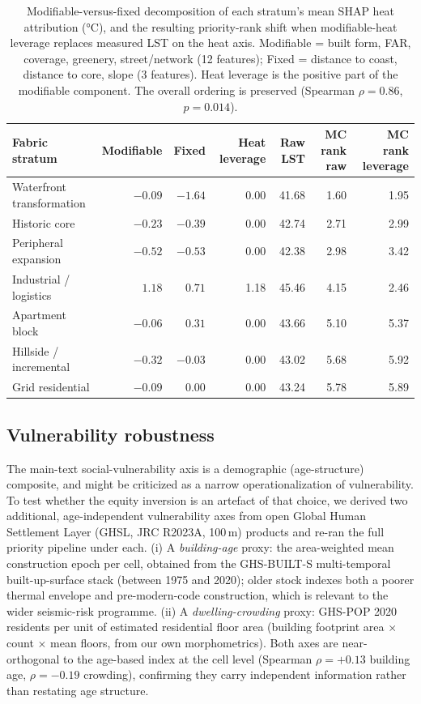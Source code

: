 \begin{table}[htbp]
  \centering\scriptsize
  \setlength{\tabcolsep}{3pt}
  \caption{Modifiable-versus-fixed decomposition of each stratum's mean SHAP heat attribution ($\si{\celsius}$),
  and the resulting priority-rank shift when modifiable-heat leverage replaces measured LST on the heat axis.
  Modifiable = built form, FAR, coverage, greenery, street/network (12 features); Fixed = distance to coast,
  distance to core, slope (3 features). Heat leverage is the positive part of the modifiable component. The
  overall ordering is preserved (Spearman $\rho = 0.86$, $p = 0.014$).}
  \label{tab:heat-leverage}
  \begin{tabular}{@{}lrrrrrr@{}}
    \toprule
    Fabric stratum & Modifiable & Fixed & Heat leverage & Raw LST & MC rank raw & MC rank leverage \\
    \midrule
    Waterfront transformation & $-0.09$ & $-1.64$ & 0.00 & 41.68 & 1.60 & 1.95 \\
    Historic core             & $-0.23$ & $-0.39$ & 0.00 & 42.74 & 2.71 & 2.99 \\
    Peripheral expansion      & $-0.52$ & $-0.53$ & 0.00 & 42.38 & 2.98 & 3.42 \\
    Industrial / logistics    & $1.18$  & $0.71$  & 1.18 & 45.46 & 4.15 & 2.46 \\
    Apartment block           & $-0.06$ & $0.31$  & 0.00 & 43.66 & 5.10 & 5.37 \\
    Hillside / incremental    & $-0.32$ & $-0.03$ & 0.00 & 43.02 & 5.68 & 5.92 \\
    Grid residential          & $-0.09$ & $0.00$  & 0.00 & 43.24 & 5.78 & 5.89 \\
    \bottomrule
  \end{tabular}
\end{table}

\subsection{Vulnerability robustness}
\label{app:vuln-robust}
The main-text social-vulnerability axis is a demographic (age-structure) composite, and might be criticized as a
narrow operationalization of vulnerability. To test whether the equity inversion is an artefact of that choice, we
derived two additional, age-independent vulnerability axes from open Global Human Settlement Layer (GHSL, JRC
R2023A, 100\,m) products and re-ran the full priority pipeline under each. (i) A \emph{building-age} proxy: the
area-weighted mean construction epoch per cell, obtained from the GHS-BUILT-S multi-temporal built-up-surface
stack (between 1975 and 2020); older stock indexes both a poorer thermal envelope and
pre-modern-code construction, which is relevant to the wider seismic-risk programme. (ii) A \emph{dwelling-crowding} proxy: GHS-POP 2020 residents per unit of
estimated residential floor area (building footprint area $\times$ count $\times$ mean floors, from our own
morphometrics). Both axes are near-orthogonal to the age-based index at the cell level (Spearman $\rho = +0.13$
building age, $\rho = -0.19$ crowding), confirming they carry independent information rather than restating age
structure.

